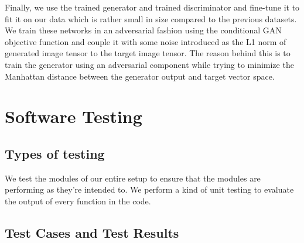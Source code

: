 \documentclass[oneside,a4paper,12pt]{report}
\begin{document}
\hspace*{0.25 in}Finally, we use the trained generator and trained discriminator and fine-tune it to fit it on our data which is rather small in size compared to the previous datasets. We train these networks in an adversarial fashion using the conditional GAN objective function \citep{isola2018imagetoimage} and couple it with some noise introduced as the L1 norm of generated image tensor to the target image tensor. The reason behind this is to train the generator using an adversarial component while trying to minimize the Manhattan distance between the generator output and target vector space.

\chapter{Software Testing}
\section{Types of testing}
\hspace{0.25 in}We test the modules of our entire setup to ensure that the modules are performing as they're intended to. 
We perform a kind of unit testing to evaluate the output of every function in the code. 
\section{Test Cases and Test Results}
\end{document}
